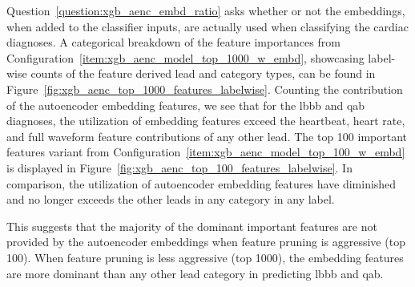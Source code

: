\documentclass[\main/thesis.tex]{subfiles}
\begin{document}
Question~\ref{question:xgb_aenc_embd_ratio} asks whether or not the embeddings, when added to the classifier inputs, are actually used when classifying the cardiac diagnoses.
A categorical breakdown of the feature importances from Configuration~\ref{item:xgb_aenc_model_top_1000_w_embd}, showcasing label-wise counts of the feature derived lead and category types, can be found in Figure~\ref{fig:xgb_aenc_top_1000_features_labelwise}.
Counting the contribution of the autoencoder embedding features, we see that for the \gls{lbbb} and \gls{qab} diagnoses, the utilization of embedding features exceed the heartbeat, heart rate, and full waveform feature contributions of any other lead.
The top 100 important features variant from Configuration~\ref{item:xgb_aenc_model_top_100_w_embd} is displayed in Figure~\ref{fig:xgb_aenc_top_100_features_labelwise}.
In comparison, the utilization of autoencoder embedding features have diminished and no longer exceeds the other leads in any category in any label.

This suggests that the majority of the dominant important features are not provided by the autoencoder embeddings when feature pruning is aggressive (top 100).
When feature pruning is less aggressive (top 1000), the embedding features are more dominant than any other lead category in predicting \gls{lbbb} and \gls{qab}.
\end{document}
